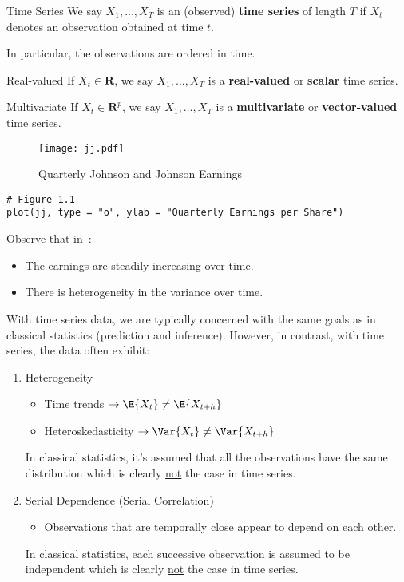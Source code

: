 \begin{Definition}{Time Series}{}
    We say $ X_1,\ldots,X_T $ is an (observed)
    \textbf{time series} of length $ T $ if $ X_t $
    denotes an observation obtained at time $ t $.

    In particular, the observations are ordered in time.
\end{Definition}
\begin{Definition}{Real-valued}{}
    If $ X_t\in\mathbf{R} $, we say $ X_1,\ldots,X_T $ is
    a \textbf{real-valued} or \textbf{scalar} time series.
\end{Definition}
\begin{Definition}{Multivariate}{}
    If $ X_t\in\mathbf{R}^p $, we say $ X_1,\ldots,X_T $
    is a \textbf{multivariate} or \textbf{vector-valued}
    time series.
\end{Definition}

\begin{figure}[!ht]
    \centering
    \texttt{[image: jj.pdf]}
    \caption{Quarterly Johnson and Johnson Earnings}\label{fig:jj}
\end{figure}
\begin{verbatim}
# Figure 1.1
plot(jj, type = "o", ylab = "Quarterly Earnings per Share")
\end{verbatim}
Observe that in~:
\begin{itemize}
    \item The earnings are steadily increasing over time.
    \item There is heterogeneity in the variance over time.
\end{itemize}

With time series data, we are typically concerned
with the same goals as in classical statistics (prediction and inference).
However, in contrast, with time series, the data often exhibit:
\begin{enumerate}[(1)]
    \item Heterogeneity
          \begin{itemize}
              \item Time trends $ \rightarrow \E{X_t}\neq \E{X_{t+h}} $
              \item Heteroskedasticity
                    $ \rightarrow \Var{X_t}\neq \Var{X_{t+h}} $
          \end{itemize}
          {\color{blue}In classical statistics, it's assumed that all the observations have the
          same distribution which is clearly \underline{not} the case in time series.}
    \item Serial Dependence (Serial Correlation)
          \begin{itemize}
              \item Observations that are temporally close appear to depend
                    on each other.
          \end{itemize}
          {\color{blue}In classical statistics, each successive observation is assumed
          to be independent which is clearly \underline{not} the case in time series.}
\end{enumerate}

